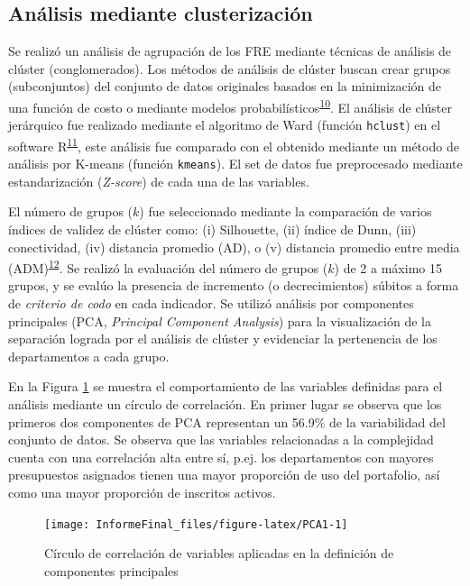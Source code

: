 \documentclass[
  oneside]{book}
\begin{document}
\hypertarget{anuxe1lisis-mediante-clusterizaciuxf3n}{%
\subsection{Análisis mediante clusterización}\label{anuxe1lisis-mediante-clusterizaciuxf3n}}

Se realizó un análisis de agrupación de los FRE mediante técnicas de análisis de clúster (conglomerados). Los métodos de análisis de clúster buscan crear grupos (subconjuntos) del conjunto de datos originales basados en la minimización de una función de costo o mediante modelos probabilísticos\textsuperscript{\protect\hyperlink{ref-Hennig2016}{10}}. El análisis de clúster jerárquico fue realizado mediante el algoritmo de Ward (función \texttt{hclust}) en el software R\textsuperscript{\protect\hyperlink{ref-R_Stats}{11}}, este análisis fue comparado con el obtenido mediante un método de análisis por K-means (función \texttt{kmeans}). El set de datos fue preprocesado mediante estandarización (\emph{Z-score}) de cada una de las variables.

El número de grupos (\(k\)) fue seleccionado mediante la comparación de varios índices de validez de clúster como: (i) Silhouette, (ii) índice de Dunn, (iii) conectividad, (iv) distancia promedio (AD), o (v) distancia promedio entre media (ADM)\textsuperscript{\protect\hyperlink{ref-R_clValid}{12}}. Se realizó la evaluación del número de grupos (\(k\)) de 2 a máximo 15 grupos, y se evalúo la presencia de incremento (o decrecimientos) súbitos a forma de \emph{criterio de codo} en cada indicador. Se utilizó análisis por componentes principales (PCA, \emph{Principal Component Analysis}) para la visualización de la separación lograda por el análisis de clúster y evidenciar la pertenencia de los departamentos a cada grupo.

En la Figura \ref{fig:PCA1} se muestra el comportamiento de las variables definidas para el análisis mediante un círculo de correlación. En primer lugar se observa que los primeros dos componentes de PCA representan un 56.9\% de la variabilidad del conjunto de datos. Se observa que las variables relacionadas a la complejidad cuenta con una correlación alta entre sí, p.ej. los departamentos con mayores presupuestos asignados tienen una mayor proporción de uso del portafolio, así como una mayor proporción de inscritos activos.

\begin{figure}[t]

{\centering \texttt{[image: InformeFinal\_files/figure-latex/PCA1-1]} 

}

\caption{Círculo de correlación de variables aplicadas en la definición de componentes principales}\label{fig:PCA1}
\end{figure}
\end{document}
